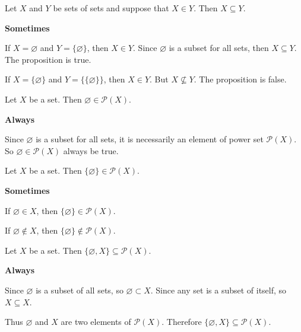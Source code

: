 \begin{chapex} %
\label{2.E.34}
Let $X$ and $Y$ be sets of sets and suppose that $X \in Y$. Then $X \subseteq Y$.
\end{chapex}

\begin{mysolution}
    \textbf{Sometimes}

    If $X = \varnothing$ and $Y=\{\varnothing\}$, then $X \in Y$. Since $\varnothing$ is a subset for all sets, then $X \subseteq Y$. The proposition is true.

    If $X = \{\varnothing\}$ and $Y=\{\{\varnothing\}\}$, then $X \in Y$. But $X \nsubseteq Y$. The proposition is false.
\end{mysolution}    

\begin{chapex} %
Let $X$ be a set. Then $\varnothing \in \mathcal{P}(X)$.
\end{chapex}

\begin{mysolution}
    \textbf{Always}

    Since $\varnothing$ is a subset for all sets, it is necessarily an element of power set $\mathcal{P}(X)$. So $\varnothing \in \mathcal{P}(X)$ always be true.
\end{mysolution}  

\begin{chapex} %
Let $X$ be a set. Then $\{ \varnothing \} \in \mathcal{P}(X)$.
\end{chapex}

\begin{mysolution}
    \textbf{Sometimes}

    If $\varnothing \in X$, then $\{ \varnothing \} \in \mathcal{P}(X)$.

    If $\varnothing \notin X$, then $\{ \varnothing \} \notin \mathcal{P}(X)$.
\end{mysolution}  

\begin{chapex} %
Let $X$ be a set. Then $\{ \varnothing, X \} \subseteq \mathcal{P}(X)$.
\end{chapex}

\begin{mysolution}
    \textbf{Always}

    Since $\varnothing$ is a subset of all sets, so $\varnothing \subset X$.
    Since any set is a subset of itself, so $X \subseteq X$.

    Thus $\varnothing$ and $X$ are two elements of $\mathcal{P}(X)$. Therefore $\{ \varnothing, X \} \subseteq \mathcal{P}(X)$.
\end{mysolution}  

